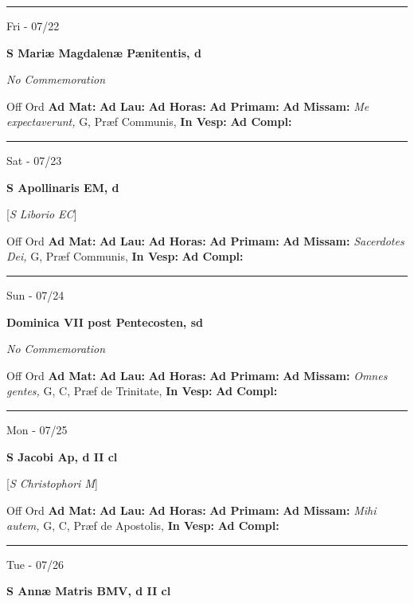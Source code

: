 \documentclass[letterpaper, 10pt]{article}
\begin{document}
\hrule
\begin{center}
Fri - 07/22
\end{center}\textbf{ \large S Mariæ Magdalenæ Pænitentis, \textnormal{\normalsize d}}

\textit{No Commemoration}\begin{justify}
Off Ord
\textbf{Ad Mat: }
\textbf{Ad Lau: }
\textbf{Ad Horas: }
\textbf{Ad Primam: }
\textbf{Ad Missam:} \textit{Me expectaverunt, } G, Præf Communis, 
\textbf{In Vesp: }
\textbf{Ad Compl: }\end{justify}



\hrule
\begin{center}
Sat - 07/23
\end{center}\textbf{ \large S Apollinaris EM, \textnormal{\normalsize d}}

[\textit{S Liborio EC}]
\begin{justify}
Off Ord
\textbf{Ad Mat: }
\textbf{Ad Lau: }
\textbf{Ad Horas: }
\textbf{Ad Primam: }
\textbf{Ad Missam:} \textit{Sacerdotes Dei, } G, Præf Communis, 
\textbf{In Vesp: }
\textbf{Ad Compl: }\end{justify}



\hrule
\begin{center}
Sun - 07/24
\end{center}\textbf{ \large Dominica VII post Pentecosten, \textnormal{\normalsize sd}}

\textit{No Commemoration}\begin{justify}
Off Ord
\textbf{Ad Mat: }
\textbf{Ad Lau: }
\textbf{Ad Horas: }
\textbf{Ad Primam: }
\textbf{Ad Missam:} \textit{Omnes gentes, } G, C, Præf de Trinitate, 
\textbf{In Vesp: }
\textbf{Ad Compl: }\end{justify}



\hrule
\begin{center}
Mon - 07/25
\end{center}\textbf{ \large S Jacobi Ap, \textnormal{\normalsize d II cl}}

[\textit{S Christophori M}]
\begin{justify}
Off Ord
\textbf{Ad Mat: }
\textbf{Ad Lau: }
\textbf{Ad Horas: }
\textbf{Ad Primam: }
\textbf{Ad Missam:} \textit{Mihi autem, } G, C, Præf de Apostolis, 
\textbf{In Vesp: }
\textbf{Ad Compl: }\end{justify}



\hrule
\begin{center}
Tue - 07/26
\end{center}\textbf{ \large S Annæ Matris BMV, \textnormal{\normalsize d II cl}}
\end{document}
